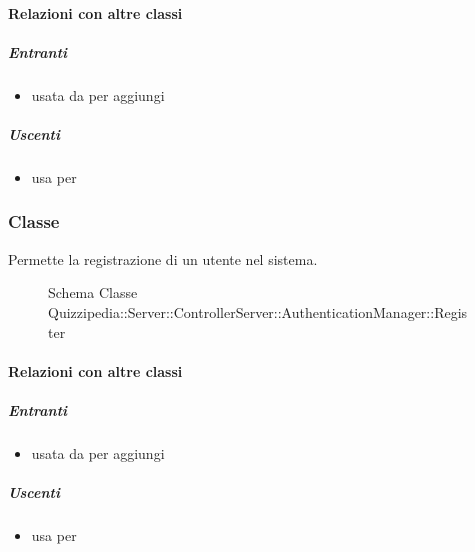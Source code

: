 \paragraph{Relazioni con altre classi}
\subparagraph{Entranti}
\begin{itemize}
\item usata da  per aggiungi
\end{itemize}
\subparagraph{Uscenti}
\begin{itemize}
\item usa  per 
\end{itemize}
\subsubsection{Classe }
Permette la registrazione di un utente nel sistema.
\begin{figure}[H]
\centering
\noindent{}
\caption[Schema Classe Register]{Schema Classe Quizzipedia::Server::ControllerServer::AuthenticationManager::Register}
\end{figure}
\paragraph{Relazioni con altre classi}
\subparagraph{Entranti}
\begin{itemize}
\item usata da  per aggiungi
\end{itemize}
\subparagraph{Uscenti}
\begin{itemize}
\item usa  per 
\end{itemize}
